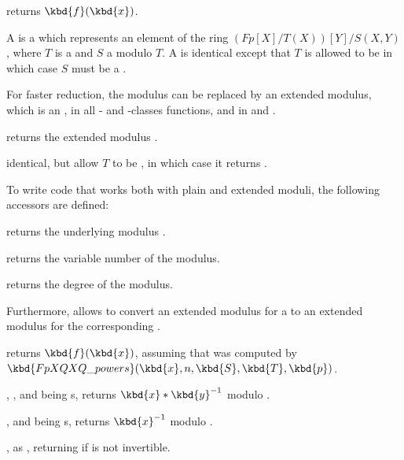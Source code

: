 
 returns
$\kbd{f}(\kbd{x})$.


A  is a  which represents an element of the ring
$(Fp[X]/T(X))[Y]/S(X,Y)$, where $T$ is a  and $S$ a 
modulo $T$.  A  is identical except that $T$ is allowed to be
 in which case $S$ must be a .


For faster reduction, the modulus  can be replaced by an extended
modulus, which is an , in all - and -classes
functions, and in  and .

 returns the extended modulus
.

 identical, but allow $T$ to
be , in which case it returns .

To write code that works both with plain and extended moduli, the following
accessors are defined:

 returns the underlying modulus .

 returns the variable number of the modulus.

 returns the degree of the modulus.

Furthermore,  allows to convert an extended modulus for
a  to an extended modulus for the corresponding .


 returns
$\kbd{f}(\kbd{x})$, assuming that  was computed by
$\kbd{FpXQXQ\_powers}(\kbd{x}, n, \kbd{S}, \kbd{T}, \kbd{p})$.

, ,  and
 being s, returns $\kbd{x}*\kbd{y}^{-1}$ modulo .

,  and
 being s, returns $\kbd{x}^{-1}$ modulo .

, as ,
returning  if  is not invertible.

